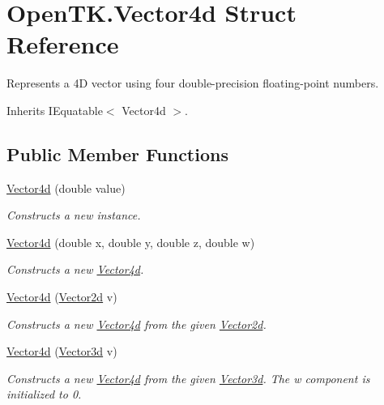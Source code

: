 \hypertarget{struct_open_t_k_1_1_vector4d}{\section{Open\-T\-K.\-Vector4d Struct Reference}
\label{struct_open_t_k_1_1_vector4d}
}


Represents a 4\-D vector using four double-\/precision floating-\/point numbers. 




Inherits I\-Equatable$<$ Vector4d $>$.

\subsection*{Public Member Functions}
\begin{DoxyCompactItemize}
\item 
\hyperlink{struct_open_t_k_1_1_vector4d_ab4afe4406c86c6693edac973f710356d}{Vector4d} (double value)
\begin{DoxyCompactList}\small\item\em Constructs a new instance. \end{DoxyCompactList}\item 
\hyperlink{struct_open_t_k_1_1_vector4d_a47105860f220f7cbc524f065d6a17b82}{Vector4d} (double x, double y, double z, double w)
\begin{DoxyCompactList}\small\item\em Constructs a new \hyperlink{struct_open_t_k_1_1_vector4d}{Vector4d}. \end{DoxyCompactList}\item 
\hyperlink{struct_open_t_k_1_1_vector4d_ac3600a0cba851d83c6c0ebf05512bd66}{Vector4d} (\hyperlink{struct_open_t_k_1_1_vector2d}{Vector2d} v)
\begin{DoxyCompactList}\small\item\em Constructs a new \hyperlink{struct_open_t_k_1_1_vector4d}{Vector4d} from the given \hyperlink{struct_open_t_k_1_1_vector2d}{Vector2d}. \end{DoxyCompactList}\item 
\hyperlink{struct_open_t_k_1_1_vector4d_a88c5be55f77a7fc7d7c3d502a405588c}{Vector4d} (\hyperlink{struct_open_t_k_1_1_vector3d}{Vector3d} v)
\begin{DoxyCompactList}\small\item\em Constructs a new \hyperlink{struct_open_t_k_1_1_vector4d}{Vector4d} from the given \hyperlink{struct_open_t_k_1_1_vector3d}{Vector3d}. The w component is initialized to 0. \end{DoxyCompactList}\item 

\end{DoxyCompactItemize}
